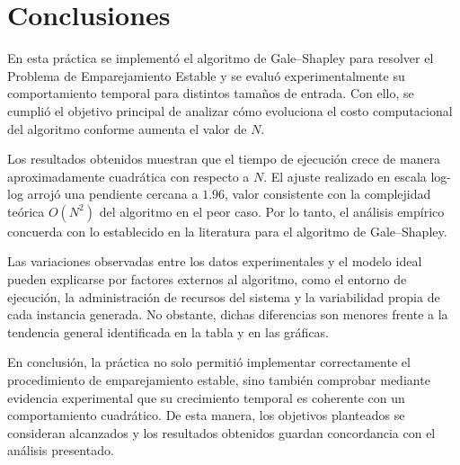 \section{Conclusiones}

En esta práctica se implementó el algoritmo de Gale--Shapley para resolver el Problema de Emparejamiento Estable y se evaluó experimentalmente su comportamiento temporal para distintos tamaños de entrada. Con ello, se cumplió el objetivo principal de analizar cómo evoluciona el costo computacional del algoritmo conforme aumenta el valor de $N$.

Los resultados obtenidos muestran que el tiempo de ejecución crece de manera aproximadamente cuadrática con respecto a $N$. El ajuste realizado en escala log-log arrojó una pendiente cercana a $1.96$, valor consistente con la complejidad teórica $O(N^2)$ del algoritmo en el peor caso. Por lo tanto, el análisis empírico concuerda con lo establecido en la literatura para el algoritmo de Gale--Shapley.

Las variaciones observadas entre los datos experimentales y el modelo ideal pueden explicarse por factores externos al algoritmo, como el entorno de ejecución, la administración de recursos del sistema y la variabilidad propia de cada instancia generada. No obstante, dichas diferencias son menores frente a la tendencia general identificada en la tabla y en las gráficas.

En conclusión, la práctica no solo permitió implementar correctamente el procedimiento de emparejamiento estable, sino también comprobar mediante evidencia experimental que su crecimiento temporal es coherente con un comportamiento cuadrático. De esta manera, los objetivos planteados se consideran alcanzados y los resultados obtenidos guardan concordancia con el análisis presentado.
